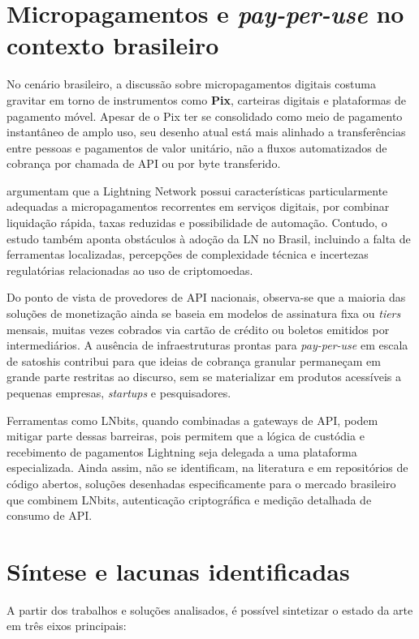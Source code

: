 \documentclass[openright]{normas-utf-tex}
\begin{document}
\section{Micropagamentos e \textit{pay-per-use} no contexto brasileiro}

No cenário brasileiro, a discussão sobre micropagamentos digitais costuma gravitar em torno de instrumentos como \textbf{Pix}, carteiras digitais e plataformas de pagamento móvel. Apesar de o Pix ter se consolidado como meio de pagamento instantâneo de amplo uso, seu desenho atual está mais alinhado a transferências entre pessoas e pagamentos de valor unitário, não a fluxos automatizados de cobrança por chamada de API ou por byte transferido.

 argumentam que a Lightning Network possui características particularmente adequadas a micropagamentos recorrentes em serviços digitais, por combinar liquidação rápida, taxas reduzidas e possibilidade de automação. Contudo, o estudo também aponta obstáculos à adoção da LN no Brasil, incluindo a falta de ferramentas localizadas, percepções de complexidade técnica e incertezas regulatórias relacionadas ao uso de criptomoedas.

Do ponto de vista de provedores de API nacionais, observa-se que a maioria das soluções de monetização ainda se baseia em modelos de assinatura fixa ou \textit{tiers} mensais, muitas vezes cobrados via cartão de crédito ou boletos emitidos por intermediários. A ausência de infraestruturas prontas para \textit{pay-per-use} em escala de satoshis contribui para que ideias de cobrança granular permaneçam em grande parte restritas ao discurso, sem se materializar em produtos acessíveis a pequenas empresas, \textit{startups} e pesquisadores.

Ferramentas como LNbits, quando combinadas a gateways de API, podem mitigar parte dessas barreiras, pois permitem que a lógica de custódia e recebimento de pagamentos Lightning seja delegada a uma plataforma especializada. Ainda assim, não se identificam, na literatura e em repositórios de código abertos, soluções desenhadas especificamente para o mercado brasileiro que combinem LNbits, autenticação criptográfica e medição detalhada de consumo de API.

\section{Síntese e lacunas identificadas}

A partir dos trabalhos e soluções analisados, é possível sintetizar o estado da arte em três eixos principais:
\end{document}
